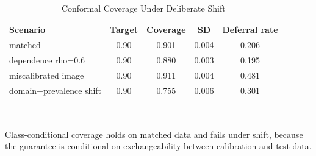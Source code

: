 \begin{table}[!htbp]
\caption{Conformal Coverage Under Deliberate Shift}
\label{tab:sconformal}
\centering\footnotesize
\begin{tabular}{@{}lcccc@{}}
\toprule
Scenario & Target & Coverage & SD & Deferral rate \\
\midrule
matched & 0.90 & 0.901 & 0.004 & 0.206 \\
dependence rho=0.6 & 0.90 & 0.880 & 0.003 & 0.195 \\
miscalibrated image & 0.90 & 0.911 & 0.004 & 0.481 \\
domain+prevalence shift & 0.90 & 0.755 & 0.006 & 0.301 \\
\bottomrule
\end{tabular}
\\[2pt]\begin{minipage}{\textwidth}\scriptsize Class-conditional coverage holds on matched data and fails under shift, because the guarantee is conditional on exchangeability between calibration and test data.\end{minipage}
\end{table}
